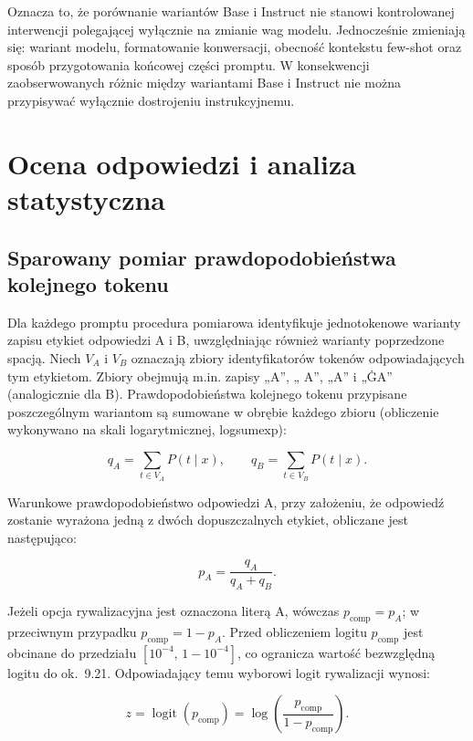 \documentclass[11pt]{article}
\newcommand{\logit}{\operatorname{logit}}
\begin{document}
Oznacza to, że porównanie wariantów Base i Instruct nie stanowi kontrolowanej interwencji polegającej wyłącznie na zmianie wag modelu. Jednocześnie zmieniają się: wariant modelu, formatowanie konwersacji, obecność kontekstu few-shot oraz sposób przygotowania końcowej części promptu. W konsekwencji zaobserwowanych różnic między wariantami Base i Instruct nie można przypisywać wyłącznie dostrojeniu instrukcyjnemu.

\section{Ocena odpowiedzi i analiza statystyczna}
\subsection{Sparowany pomiar prawdopodobieństwa kolejnego tokenu}
Dla każdego promptu procedura pomiarowa identyfikuje jednotokenowe warianty zapisu etykiet odpowiedzi A i B, uwzględniając również warianty poprzedzone spacją. Niech $V_A$ i $V_B$ oznaczają zbiory identyfikatorów tokenów odpowiadających tym etykietom. Zbiory obejmują m.in. zapisy „A”, „ A”, „\textunderscore A” i „ĠA” (analogicznie dla B). Prawdopodobieństwa kolejnego tokenu przypisane poszczególnym wariantom są sumowane w obrębie każdego zbioru (obliczenie wykonywano na skali logarytmicznej, logsumexp):

\begin{equation}
    q_A = \sum_{t\in V_A} P(t\mid x),\qquad
    q_B = \sum_{t\in V_B} P(t\mid x).
\end{equation}

Warunkowe prawdopodobieństwo odpowiedzi A, przy założeniu, że odpowiedź zostanie wyrażona jedną z dwóch dopuszczalnych etykiet, obliczane jest następująco:

\begin{equation}
    p_A = \frac{q_A}{q_A+q_B}.
\end{equation}

Jeżeli opcja rywalizacyjna jest oznaczona literą A, wówczas $p_{\mathrm{comp}}=p_A$; w przeciwnym przypadku $p_{\mathrm{comp}}=1-p_A$. Przed obliczeniem logitu $p_{\mathrm{comp}}$ jest obcinane do przedziału $[10^{-4},\,1-10^{-4}]$, co ogranicza wartość bezwzględną logitu do ok.\ 9.21. Odpowiadający temu wyborowi logit rywalizacji wynosi:

\begin{equation}
    z=\logit(p_{\mathrm{comp}})=\log\left(\frac{p_{\mathrm{comp}}}{1-p_{\mathrm{comp}}}\right).
\end{equation}
\end{document}
